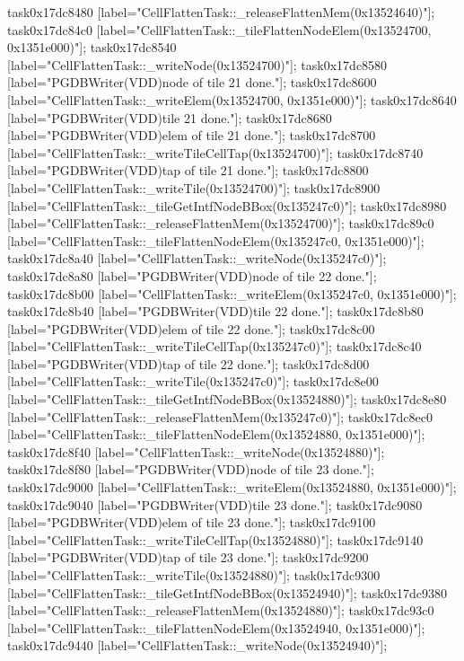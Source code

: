 {	task0x17dc8480 [label="CellFlattenTask::_releaseFlattenMem(0x13524640)"];
	task0x17dc84c0 [label="CellFlattenTask::_tileFlattenNodeElem(0x13524700, 0x1351e000)"];
	task0x17dc8540 [label="CellFlattenTask::_writeNode(0x13524700)"];
	task0x17dc8580 [label="PGDBWriter(VDD)\nCell node of tile 21 done."];
	task0x17dc8600 [label="CellFlattenTask::_writeElem(0x13524700, 0x1351e000)"];
	task0x17dc8640 [label="PGDBWriter(VDD)\nCell tile 21 done."];
	task0x17dc8680 [label="PGDBWriter(VDD)\nCell elem of tile 21 done."];
	task0x17dc8700 [label="CellFlattenTask::_writeTileCellTap(0x13524700)"];
	task0x17dc8740 [label="PGDBWriter(VDD)\nCell tap of tile 21 done."];
	task0x17dc8800 [label="CellFlattenTask::_writeTile(0x13524700)"];
	task0x17dc8900 [label="CellFlattenTask::_tileGetIntfNodeBBox(0x135247c0)"];
	task0x17dc8980 [label="CellFlattenTask::_releaseFlattenMem(0x13524700)"];
	task0x17dc89c0 [label="CellFlattenTask::_tileFlattenNodeElem(0x135247c0, 0x1351e000)"];
	task0x17dc8a40 [label="CellFlattenTask::_writeNode(0x135247c0)"];
	task0x17dc8a80 [label="PGDBWriter(VDD)\nCell node of tile 22 done."];
	task0x17dc8b00 [label="CellFlattenTask::_writeElem(0x135247c0, 0x1351e000)"];
	task0x17dc8b40 [label="PGDBWriter(VDD)\nCell tile 22 done."];
	task0x17dc8b80 [label="PGDBWriter(VDD)\nCell elem of tile 22 done."];
	task0x17dc8c00 [label="CellFlattenTask::_writeTileCellTap(0x135247c0)"];
	task0x17dc8c40 [label="PGDBWriter(VDD)\nCell tap of tile 22 done."];
	task0x17dc8d00 [label="CellFlattenTask::_writeTile(0x135247c0)"];
	task0x17dc8e00 [label="CellFlattenTask::_tileGetIntfNodeBBox(0x13524880)"];
	task0x17dc8e80 [label="CellFlattenTask::_releaseFlattenMem(0x135247c0)"];
	task0x17dc8ec0 [label="CellFlattenTask::_tileFlattenNodeElem(0x13524880, 0x1351e000)"];
	task0x17dc8f40 [label="CellFlattenTask::_writeNode(0x13524880)"];
	task0x17dc8f80 [label="PGDBWriter(VDD)\nCell node of tile 23 done."];
	task0x17dc9000 [label="CellFlattenTask::_writeElem(0x13524880, 0x1351e000)"];
	task0x17dc9040 [label="PGDBWriter(VDD)\nCell tile 23 done."];
	task0x17dc9080 [label="PGDBWriter(VDD)\nCell elem of tile 23 done."];
	task0x17dc9100 [label="CellFlattenTask::_writeTileCellTap(0x13524880)"];
	task0x17dc9140 [label="PGDBWriter(VDD)\nCell tap of tile 23 done."];
	task0x17dc9200 [label="CellFlattenTask::_writeTile(0x13524880)"];
	task0x17dc9300 [label="CellFlattenTask::_tileGetIntfNodeBBox(0x13524940)"];
	task0x17dc9380 [label="CellFlattenTask::_releaseFlattenMem(0x13524880)"];
	task0x17dc93c0 [label="CellFlattenTask::_tileFlattenNodeElem(0x13524940, 0x1351e000)"];
	task0x17dc9440 [label="CellFlattenTask::_writeNode(0x13524940)"];
}
